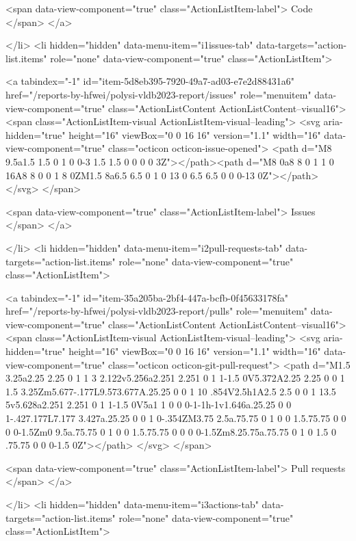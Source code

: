 {{        <span data-view-component="true" class="ActionListItem-label">
          Code
</span>      
</a>
  
</li>
        <li hidden="hidden" data-menu-item="i1issues-tab" data-targets="action-list.items" role="none" data-view-component="true" class="ActionListItem">
    
    
    <a tabindex="-1" id="item-5d8eb395-7920-49a7-ad03-e7e2d88431a6" href="/reports-by-hfwei/polysi-vldb2023-report/issues" role="menuitem" data-view-component="true" class="ActionListContent ActionListContent--visual16">
        <span class="ActionListItem-visual ActionListItem-visual--leading">
          <svg aria-hidden="true" height="16" viewBox="0 0 16 16" version="1.1" width="16" data-view-component="true" class="octicon octicon-issue-opened">
    <path d="M8 9.5a1.5 1.5 0 1 0 0-3 1.5 1.5 0 0 0 0 3Z"></path><path d="M8 0a8 8 0 1 1 0 16A8 8 0 0 1 8 0ZM1.5 8a6.5 6.5 0 1 0 13 0 6.5 6.5 0 0 0-13 0Z"></path>
</svg>
        </span>
      
        <span data-view-component="true" class="ActionListItem-label">
          Issues
</span>      
</a>
  
</li>
        <li hidden="hidden" data-menu-item="i2pull-requests-tab" data-targets="action-list.items" role="none" data-view-component="true" class="ActionListItem">
    
    
    <a tabindex="-1" id="item-35a205ba-2bf4-447a-bcfb-0f45633178fa" href="/reports-by-hfwei/polysi-vldb2023-report/pulls" role="menuitem" data-view-component="true" class="ActionListContent ActionListContent--visual16">
        <span class="ActionListItem-visual ActionListItem-visual--leading">
          <svg aria-hidden="true" height="16" viewBox="0 0 16 16" version="1.1" width="16" data-view-component="true" class="octicon octicon-git-pull-request">
    <path d="M1.5 3.25a2.25 2.25 0 1 1 3 2.122v5.256a2.251 2.251 0 1 1-1.5 0V5.372A2.25 2.25 0 0 1 1.5 3.25Zm5.677-.177L9.573.677A.25.25 0 0 1 10 .854V2.5h1A2.5 2.5 0 0 1 13.5 5v5.628a2.251 2.251 0 1 1-1.5 0V5a1 1 0 0 0-1-1h-1v1.646a.25.25 0 0 1-.427.177L7.177 3.427a.25.25 0 0 1 0-.354ZM3.75 2.5a.75.75 0 1 0 0 1.5.75.75 0 0 0 0-1.5Zm0 9.5a.75.75 0 1 0 0 1.5.75.75 0 0 0 0-1.5Zm8.25.75a.75.75 0 1 0 1.5 0 .75.75 0 0 0-1.5 0Z"></path>
</svg>
        </span>
      
        <span data-view-component="true" class="ActionListItem-label">
          Pull requests
</span>      
</a>
  
</li>
        <li hidden="hidden" data-menu-item="i3actions-tab" data-targets="action-list.items" role="none" data-view-component="true" class="ActionListItem">
    
}}
